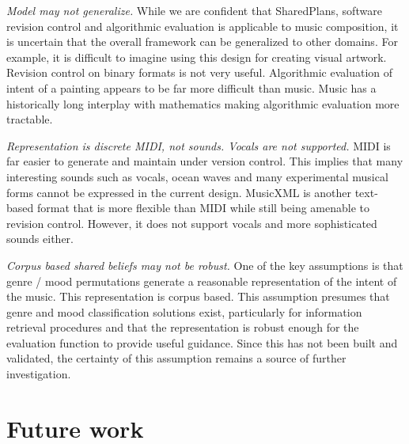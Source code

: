 \documentclass[final,authoryear,5p,times,twocolumn]{elsarticle}
\begin{document}
\textit{Model may not generalize.} While we are confident that SharedPlans, software revision control and algorithmic evaluation is applicable to music composition, it is uncertain that the overall framework can be generalized to other domains. For example, it is difficult to imagine using this design for creating visual artwork. Revision control on binary formats is not very useful. Algorithmic evaluation of intent of a painting appears to be far more difficult than music. Music has a historically long interplay with mathematics making algorithmic evaluation more tractable. 

\textit{Representation is discrete MIDI, not sounds. Vocals are not supported.} MIDI is far easier to generate and maintain under version control. This implies that many interesting sounds such as vocals, ocean waves and many experimental musical forms cannot be expressed in the current design. MusicXML is another text-based format that is more flexible than MIDI while still being amenable to revision control. However, it does not support vocals and more sophisticated sounds either. 

\textit{Corpus based shared beliefs may not be robust.} One of the key assumptions is that genre / mood permutations generate a reasonable representation of the intent of the music. This representation is corpus based. This assumption presumes that genre and mood classification solutions exist, particularly for information retrieval procedures and that the representation is robust enough for the evaluation function to provide useful guidance. Since this has not been built and validated, the certainty of this assumption remains a source of further investigation.





\section {Future work}
\end{document}
